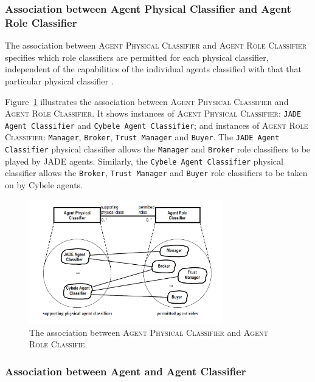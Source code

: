 \subsubsection*{Association between Agent Physical Classifier and Agent Role Classifier}

The association between \textsc{Agent Physical Classifier} and \textsc{Agent Role Classifier} specifies which role classifiers are permitted for each physical classifier, independent of the capabilities of the individual agents classified with that that particular physical classifier \cite{Odell05}.

Figure~\ref{figure:onp-physical-classifier-role-classifier-association} illustrates the association between \textsc{Agent Physical Classifier} and \textsc{Agent Role Classifier}. It shows instances of \textsc{Agent Physical Classifier}: \texttt{JADE Agent Classifier} and \texttt{Cybele Agent Classifier}; and instances of \textsc{Agent Role Classifier}: \texttt{Manager}, \texttt{Broker}, \texttt{Trust Manager} and \texttt{Buyer}.
The \texttt{JADE Agent Classifier} physical classifier allows the \texttt{Manager} and \texttt{Broker} role classifiers to be played by JADE agents.
Similarly, the \texttt{Cybele Agent Classifier} physical classifier allows the \texttt{Broker}, \texttt{Trust Manager} and \texttt{Buyer} role classifiers to be taken on by Cybele agents.

\begin{figure}[ht]
	\centering
	\includegraphics[width=0.75\textwidth]{images/onp-physical-classifier-role-classifier-association.png}
	\caption{The association between \textsc{Agent Physical Classifier} and \textsc{Agent Role Classifie}}
	\label{figure:onp-physical-classifier-role-classifier-association}
\end{figure}

\subsubsection*{Association between Agent and Agent Classifier}

